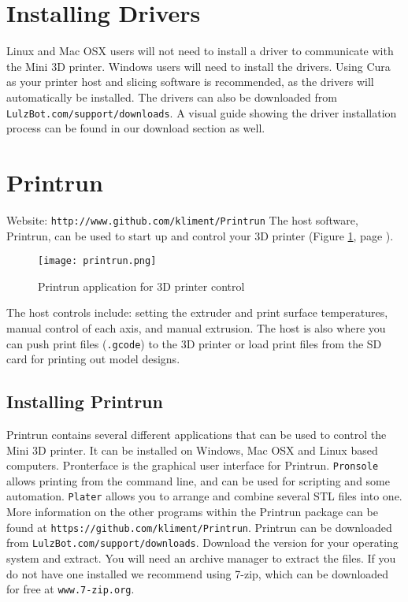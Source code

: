 \section{Installing Drivers}
Linux and Mac OSX users will not need to install a driver to communicate with the Mini 3D printer. Windows users will need to install the drivers. Using Cura as your printer host and slicing software is recommended, as the drivers will automatically be installed. The drivers can also be downloaded from \texttt{LulzBot.com/support/downloads}. A visual guide showing the driver installation process can be found in our download section as well.


   


\newpage
\section{Printrun}
\label{Printrun}
Website: \texttt{http://www.github.com/kliment/Printrun}
The host software, Printrun, can be used to start up and control your 3D printer (Figure \ref{fig:Printrun}, page \pageref{fig:Printrun}).
\begin{figure}[hbt]
\centering
\texttt{[image: printrun.png]}
\caption{Printrun application for 3D printer control}
\label{fig:Printrun}
\end{figure}
The host controls include: setting the extruder and print surface temperatures, manual control of each axis, and manual extrusion. The host is also where you can push print files (\texttt{.gcode}) to the 3D printer or load print files from the SD card for printing out model designs.

\subsection{Installing Printrun}
Printrun contains several different applications that can be used to control the Mini 3D printer. It can be installed on Windows, Mac OSX and Linux based computers. Pronterface is the graphical user interface for Printrun. \texttt{Pronsole} allows printing from the command line, and can be used for scripting and some automation. \texttt{Plater} allows you to arrange and combine several STL files into one. More information on the other programs within the Printrun package can be found at \texttt{https://github.com/kliment/Printrun}. Printrun can be downloaded from \texttt{LulzBot.com/support/downloads}. Download the version for your operating system and extract. You will need an archive manager to extract the files. If you do not have one installed we recommend using 7-zip, which can be downloaded for free at \texttt{www.7-zip.org}.

